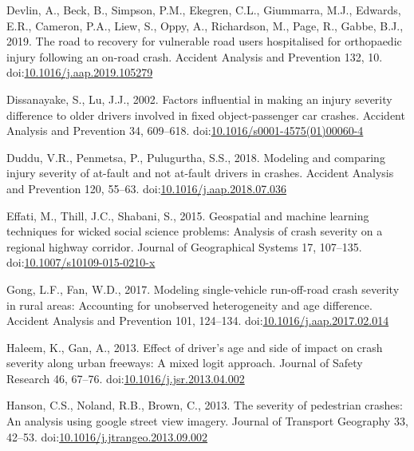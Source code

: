 \documentclass[]{elsarticle} %
\begin{document}
\leavevmode\hypertarget{ref-Devlin2019road}{}%
Devlin, A., Beck, B., Simpson, P.M., Ekegren, C.L., Giummarra, M.J.,
Edwards, E.R., Cameron, P.A., Liew, S., Oppy, A., Richardson, M., Page,
R., Gabbe, B.J., 2019. The road to recovery for vulnerable road users
hospitalised for orthopaedic injury following an on-road crash. Accident
Analysis and Prevention 132, 10.
doi:\href{https://doi.org/10.1016/j.aap.2019.105279}{10.1016/j.aap.2019.105279}

\leavevmode\hypertarget{ref-Dissanayake2002factors}{}%
Dissanayake, S., Lu, J.J., 2002. Factors influential in making an injury
severity difference to older drivers involved in fixed object-passenger
car crashes. Accident Analysis and Prevention 34, 609--618.
doi:\href{https://doi.org/10.1016/s0001-4575(01)00060-4}{10.1016/s0001-4575(01)00060-4}

\leavevmode\hypertarget{ref-Duddu2018modeling}{}%
Duddu, V.R., Penmetsa, P., Pulugurtha, S.S., 2018. Modeling and
comparing injury severity of at-fault and not at-fault drivers in
crashes. Accident Analysis and Prevention 120, 55--63.
doi:\href{https://doi.org/10.1016/j.aap.2018.07.036}{10.1016/j.aap.2018.07.036}

\leavevmode\hypertarget{ref-Effati2015geospatial}{}%
Effati, M., Thill, J.C., Shabani, S., 2015. Geospatial and machine
learning techniques for wicked social science problems: Analysis of
crash severity on a regional highway corridor. Journal of Geographical
Systems 17, 107--135.
doi:\href{https://doi.org/10.1007/s10109-015-0210-x}{10.1007/s10109-015-0210-x}

\leavevmode\hypertarget{ref-Gong2017modeling}{}%
Gong, L.F., Fan, W.D., 2017. Modeling single-vehicle run-off-road crash
severity in rural areas: Accounting for unobserved heterogeneity and age
difference. Accident Analysis and Prevention 101, 124--134.
doi:\href{https://doi.org/10.1016/j.aap.2017.02.014}{10.1016/j.aap.2017.02.014}

\leavevmode\hypertarget{ref-Haleem2013effect}{}%
Haleem, K., Gan, A., 2013. Effect of driver's age and side of impact on
crash severity along urban freeways: A mixed logit approach. Journal of
Safety Research 46, 67--76.
doi:\href{https://doi.org/10.1016/j.jsr.2013.04.002}{10.1016/j.jsr.2013.04.002}

\leavevmode\hypertarget{ref-Hanson2013severity}{}%
Hanson, C.S., Noland, R.B., Brown, C., 2013. The severity of pedestrian
crashes: An analysis using google street view imagery. Journal of
Transport Geography 33, 42--53.
doi:\href{https://doi.org/10.1016/j.jtrangeo.2013.09.002}{10.1016/j.jtrangeo.2013.09.002}
\end{document}
